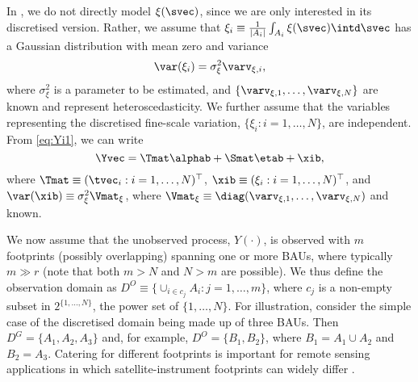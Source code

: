 In , we do not directly model $\xi(\svec)$, since we are only interested in its discretised version. Rather, we assume that $\xi_i \equiv \frac{1}{|A_i|}\int_{A_i} \xi(\svec)\intd\svec$ has a Gaussian distribution with mean zero and variance
\begin{equation*}
\var(\xi_i) = \sigma^2_\xi \varv_{\xi,i},
\end{equation*}
where $\sigma^2_\xi$ is a parameter to be estimated, and $\{\varv_{\xi,1},\dots,\varv_{\xi,N}\}$ are known and represent  heteroscedasticity. We further assume that the variables representing the discretised fine-scale variation, $\{\xi_i: i = 1,\dots,N\}$, are independent. From \eqref{eq:Yi1}, we can write
\begin{equation}\label{eq:SRE_Y}
\Yvec = \Tmat\alphab + \Smat\etab + \xib,
\end{equation}
where $\Tmat \equiv (\tvec_i: i = 1,\dots,N)^\top$, $\xib \equiv (\xi_i : i = 1,\dots,N)^\top$, and $\var(\xib) \equiv \sigma^2_\xi \Vmat_\xi$, where $\Vmat_\xi \equiv \diag(\varv_{\xi,1},\dots,\varv_{\xi,N})$ and known.

We now  assume that the unobserved process, $Y(\cdot)$, is observed with $m$ footprints (possibly overlapping) spanning one or more BAUs, where typically $m \gg r$ (note that both $m > N$ and $N >m$ are possible). We thus define the observation domain as $D^O \equiv \{ \cup_{i \in c_j} A_i : j = 1,\dots,m \}$, where $c_j$ is a non-empty subset in $2^{\{1,\dots,N\}}$, the power set of $\{1,\dots,N\}$. For illustration, consider the simple case of  the discretised domain being made up of three BAUs. Then $D^G = \{A_1,A_2,A_3\}$ and, for example, $D^O = \{B_1, B_2\}$, where $B_1 = A_1 \cup A_2$ and $B_2 = A_3$. Catering for different footprints is important for remote sensing applications in which satellite-instrument footprints can widely differ \citep[e.g.,][]{Nguyen_2012,Zammit_2015}.

